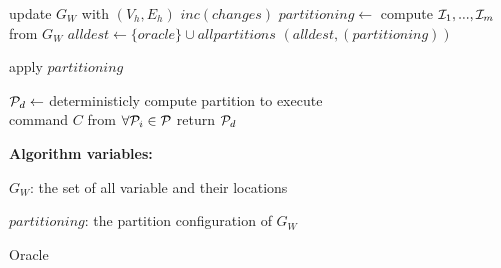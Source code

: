 \begin{algorithm}[t!]
\begin{distribalgo}[1]
	\vspace{1.0mm}

	\STATE update $G_W$ with $(V_h,E_h)$
	\STATE $inc(changes)$
		\STATE $partitioning  \leftarrow$ compute $\mathcal{I}_1, ..., \mathcal{I}_m$ from $G_W$
		\STATE $alldest \leftarrow \{oracle\} \cup all partitions$
		\STATE \amcast$(alldest, (partitioning))$
	\ENDIF
\ENDINDENT

\vspace{1.0mm}

	\STATE apply $partitioning$
\ENDINDENT

\vspace{1.0mm}

	\STATE $\mathcal{P}_d \leftarrow$ deterministicly compute partition to execute\\ \hspace{8mm} command $C$ from $\forall \mathcal{P}_i \in \mathcal{P}$
	\STATE return $\mathcal{P}_d$
\ENDINDENT	

\vspace{1.5mm}

\textbf{Algorithm variables:}

\vspace{1mm}

$G_W$: the set of all variable and their locations

$partitioning$: the partition configuration of $G_W$


\caption{Oracle}
\label{alg:oracle_proxy}
\end{distribalgo}
\end{algorithm}



